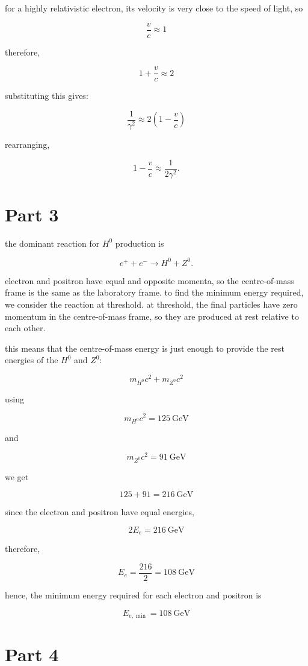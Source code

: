 \documentclass{article}
\begin{document}
for a highly relativistic electron, its velocity is very close to the speed of light, so

\[
\frac{v}{c}\approx1
\]

therefore,

\[
1+\frac{v}{c}\approx2
\]

substituting this gives:

\[
\frac{1}{\gamma^2} \approx 2\left(1-\frac{v}{c}\right)
\]

rearranging,

\[
\boxed{1-\frac{v}{c} \approx \frac{1}{2\gamma^2}
}.
\]

\section{Part 3}

the dominant reaction for $H^0$ production is

\[
e^+ + e^- \rightarrow H^0 + Z^0.
\]

electron and positron have equal and opposite momenta, so the centre-of-mass frame is the same as the laboratory frame. 
to find the minimum energy required, we consider the reaction at threshold. at threshold, the final particles have zero 
momentum in the centre-of-mass frame, so they are produced at rest relative to each other.

this means that the centre-of-mass energy is just enough to provide the rest energies of the $H^0$ and $Z^0$:

\[
m_{H^0}c^2 + m_{Z^0}c^2
\]

using

\[
m_{H^0}c^2 = 125~\mathrm{GeV}
\]

and

\[
m_{Z^0}c^2 = 91~\mathrm{GeV}
\]

we get

\[125+91=216~\mathrm{GeV}\]


since the electron and positron have equal energies,

\[
2E_e=216~\mathrm{GeV}
\]

therefore,

\[
E_e=\frac{216}{2}
=108~\mathrm{GeV}
\]

hence, the minimum energy required for each electron and positron is

\[
\boxed{E_{e,\min}=108~\mathrm{GeV}}
\]

\section{Part 4}
\end{document}
